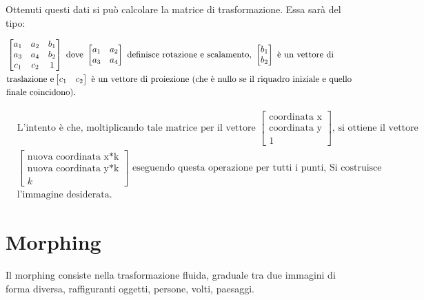 \vspace{30em} \noindent
Ottenuti questi dati si può calcolare la matrice di trasformazione. Essa sarà del tipo:

\begin{align*}
&\begin{bmatrix}
a_1&a_2&b_1\\
a_3&a_4&b_2\\
c_1&c_2&1
\end{bmatrix}
\text{ dove }
\begin{bmatrix}
a_1&a_2\\
a_3&a_4
\end{bmatrix}
\text{ definisce rotazione e scalamento, } 
\begin{bmatrix}
b_1\\
b_2
\end{bmatrix}
\text{ è un vettore di}\\
&\text{traslazione e} 
\newline
\begin{bmatrix}
c_1&c_2
\end{bmatrix}
\text{ è un vettore di proiezione (che è nullo se il riquadro iniziale e quello}\\
&\text{finale coincidono).}\\
\end{align*}

\vspace{-3em}

\begin{align*}
&\text{L'intento è che, moltiplicando tale matrice per il vettore  }
\begin{bmatrix}
\text{coordinata x}\\
\text{coordinata y}\\
1
\end{bmatrix}
\text{, si ottiene il vettore}\\
&\begin{bmatrix}
\text{nuova coordinata x*k}\\
\text{nuova coordinata y*k}\\
k
\end{bmatrix}
\text{ eseguendo questa operazione per tutti i punti, Si costruisce }\\
&\text{l'immagine desiderata.}
\end{align*}

\section{Morphing}
Il morphing consiste nella trasformazione fluida, graduale tra due immagini di forma diversa, raffiguranti oggetti, persone, volti, paesaggi.

